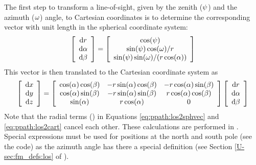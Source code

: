 The first step to transform a line-of-sight, given by the zenith
($\psi$) and the azimuth ($\omega$) angle, to Cartesian
coordinates is to determine the corresponding vector with unit length
in the spherical coordinate system:
\begin{equation}
 \left[ \begin{array}{c}
  \mathrm{d} r \\
  \mathrm{d} \alpha \\
  \mathrm{d} \beta
 \end{array} \right] =
 \left[ \begin{array}{c}
   \cos(\psi) \\
   \sin(\psi) \cos(\omega) / r \\
   \sin(\psi) \sin(\omega) / ( r \cos(\alpha) )
 \end{array} \right]
 \label{eq:ppath:los2sphvec}
\end{equation}
This vector is then translated to the Cartesian coordinate system as
\begin{equation}
 \left[ \begin{array}{c}
  \mathrm{d} x \\
  \mathrm{d} y \\
  \mathrm{d} z
 \end{array} \right] =
 \left[ \begin{array}{ccc}
  \cos(\alpha)\cos(\beta) & -r\sin(\alpha)\cos(\beta) & 
                                                   -r\cos(\alpha)\sin(\beta) \\
  \cos(\alpha)\sin(\beta) & -r\sin(\alpha)\sin(\beta) & r\cos(\alpha)\cos(\beta)\\ 
  \sin(\alpha)           & r\cos(\alpha)            & 0                     
 \end{array} \right] 
 \left[ \begin{array}{c}
  \mathrm{d} r \\
  \mathrm{d} \alpha \\
  \mathrm{d} \beta
 \end{array} \right]
 \label{eq:ppath:los2cart}
\end{equation}
Note that the radial terms (\Rds) in Equations
\ref{eq:ppath:los2sphvec} and \ref{eq:ppath:los2cart} cancel each
other.  These calculations are performed in .
Special expressions must be used for positions at the north and south
pole (see the code) as the azimuth angle has there a special
definition (see Section \ref{U-sec:fm_defs:los} of \user).

